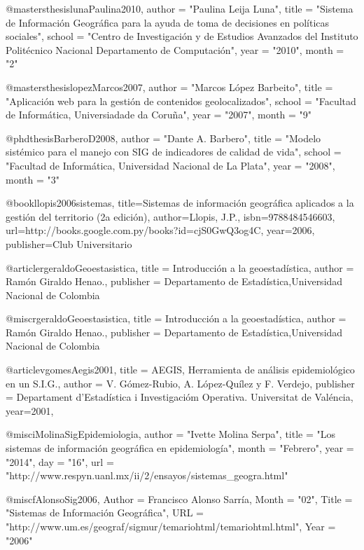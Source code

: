 
@mastersthesis{lunaPaulina2010,
    author    = "Paulina Leija Luna",
    title     = "Sistema de Información Geográfica para la ayuda de toma de decisiones en políticas sociales",
    school    = "Centro de Investigación y de Estudios Avanzados del Instituto Politécnico Nacional Departamento de Computación",
    year      = "2010",
    month     = "2"
}

@mastersthesis{lopezMarcos2007,
    author    = "Marcos López Barbeito",
    title     = "Aplicación web para la gestión de contenidos geolocalizados",
    school    = "Facultad de Informática, Universiadade da Coruña",
    year      = "2007",
    month     = "9"
}

@phdthesis{BarberoD2008,
    author    = "Dante A. Barbero",
    title     = "Modelo sistémico para el manejo con SIG de indicadores de calidad de vida",
    school    = "Facultad de Informática, Universidad Nacional de La Plata",
    year      = "2008",
    month     = "3"
}

@book{llopis2006sistemas,
  title={Sistemas de informaci{\'o}n geogr{\'a}fica aplicados a la gesti{\'o}n del territorio (2a edici{\'o}n)},
  author={Llopis, J.P.},
  isbn={9788484546603},
  url={http://books.google.com.py/books?id=cjS0GwQ3og4C},
  year={2006},
  publisher={Club Universitario}
}

@article{rgeraldoGeoestasistica,
  title = {Introducción a la geoestadística},
  author = {Ramón Giraldo Henao.},
  publisher = {Departamento de Estadística,Universidad Nacional de Colombia}
}

@misc{rgeraldoGeoestasistica,
  title = {Introducción a la geoestadística},
  author = {Ramón Giraldo Henao.},
  publisher = {Departamento de Estadística,Universidad Nacional de Colombia}
}

@article{vgomesAegis2001,
  title = {AEGIS, Herramienta de análisis epidemiológico en un S.I.G.},
  author = {V. Gómez-Rubio, A. López-Quílez y F. Verdejo},
  publisher = {Departament d’Estadística i Investigacióm Operativa. Universitat de Valéncia},
  year={2001},
}

@misc{iMolinaSigEpidemiologia,
      author = "Ivette Molina Serpa",
      title = "Los sistemas de información geográfica en epidemiología",
      month = "Febrero",
      year = "2014",
      day = "16",
      url = "http://www.respyn.uanl.mx/ii/2/ensayos/sistemas_geogra.html"
}

@misc{fAlonsoSig2006,
    Author = {Francisco Alonso Sarría},
    Month = "02",
    Title = "Sistemas de Información Geográfica",
    URL = "http://www.um.es/geograf/sigmur/temariohtml/temariohtml.html",
    Year = "2006"
}



